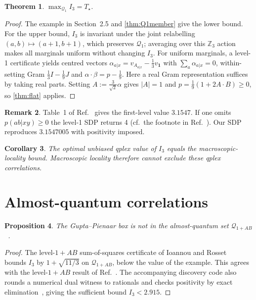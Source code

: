 \documentclass[11pt]{article}
\newtheorem{theorem}{Theorem}
\newtheorem{proposition}[theorem]{Proposition}
\newtheorem{corollary}[theorem]{Corollary}
\theoremstyle{definition}
\newtheorem{remark}[theorem]{Remark}
\newcommand{\Tq}{T_{\star}}
\newcommand{\qone}{\mathcal{Q}_1}
\newcommand{\qab}{\mathcal{Q}_{1+AB}}
\begin{document}
\begin{theorem}\label{thm:Q1max}
$\max_{\qone}I_3=\Tq$.
\end{theorem}
\begin{proof}
The example in Section~2.5 and \cref{thm:Q1member} give the lower bound. For the upper bound, $I_3$ is invariant under the joint relabelling
$(a,b)\mapsto(a+1,b+1)$, which preserves $\qone$; averaging over this $\mathbb{Z}_3$ action makes all marginals
uniform without changing $I_3$. For uniform marginals, a level-1 certificate yields centred vectors
$\alpha_{a|x}=v_{A_{a|x}}-\tfrac13v_{\mathbf{1}}$ with $\sum_a\alpha_{a|x}=0$, within-setting Gram
$\tfrac13I-\tfrac19J$ and $\alpha\cdot\beta=p-\tfrac19$. Here a real Gram representation suffices by taking real parts. Setting $A:=\tfrac3{\sqrt2}\alpha$ gives $|A|=1$ and
$p=\tfrac19(1+2A\cdot B)\ge0$, so \cref{thm:flat} applies.
\end{proof}

\begin{remark}
Table~1 of Ref.~\cite{NPA2008} gives the first-level value $3.1547$. If one omits
$p(ab|xy)\ge0$ the level-1 SDP returns 4 (cf.\ the footnote in Ref.~\cite{NavascuesWunderlich2010}).
Our SDP reproduces $3.1547005$ with positivity imposed.
\end{remark}

\begin{corollary}
The optimal unbiased qplex value of $I_3$ equals the macroscopic-locality bound. Macroscopic locality therefore
cannot exclude these qplex correlations.
\end{corollary}

\section{Almost-quantum correlations}

\begin{proposition}\label{prop:aq}
The Gupta--Pienaar box is not in the almost-quantum set $\qab$~\cite{AlmostQuantum2015}.
\end{proposition}
\begin{proof}
The level-$1+AB$ sum-of-squares certificate of Ioannou and Rosset~\cite{IoannouRosset2021}
bounds $I_3$ by $1+\sqrt{11/3}$ on $\qab$, below the value of the example.
This agrees with the level-$1+AB$ result of Ref.~\cite{NPA2008}. The accompanying
discovery code also rounds a numerical dual witness to rationals and checks positivity
by exact elimination~\cite{PeyrlParrilo2008}, giving the sufficient bound $I_3<2.915$.
\end{proof}
\end{document}
